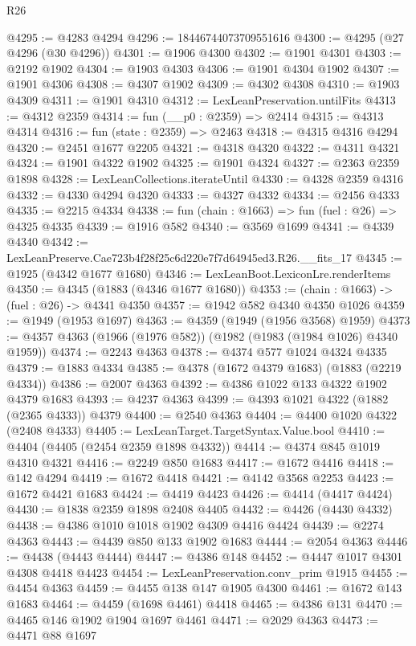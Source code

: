 \begin{lexlean}{R26}
\begin{coremodule}
@4295 := @4283 @4294
@4296 := 18446744073709551616
@4300 := @4295 (@27 @4296 (@30 @4296))
@4301 := @1906 @4300
@4302 := @1901 @4301
@4303 := @2192 @1902
@4304 := @1903 @4303
@4306 := @1901 @4304 @1902
@4307 := @1901 @4306
@4308 := @4307 @1902
@4309 := @4302 @4308
@4310 := @1903 @4309
@4311 := @1901 @4310
@4312 := LexLeanPreservation.untilFits
@4313 := @4312 @2359
@4314 := fun (__p0 : @2359) => @2414
@4315 := @4313 @4314
@4316 := fun (state : @2359) => @2463
@4318 := @4315 @4316 @4294
@4320 := @2451 @1677 @2205
@4321 := @4318 @4320
@4322 := @4311 @4321
@4324 := @1901 @4322 @1902
@4325 := @1901 @4324
@4327 := @2363 @2359 @1898
@4328 := LexLeanCollections.iterateUntil
@4330 := @4328 @2359 @4316
@4332 := @4330 @4294 @4320
@4333 := @4327 @4332
@4334 := @2456 @4333
@4335 := @2215 @4334
@4338 := fun (chain : @1663) => fun (fuel : @26) => @4325 @4335
@4339 := @1916 @582
@4340 := @3569 @1699
@4341 := @4339 @4340
@4342 := LexLeanPreserve.Cae723b4f28f25c6d220e7f7d64945ed3.R26.__fits_17
@4345 := @1925 (@4342 @1677 @1680)
@4346 := LexLeanBoot.LexiconLre.renderItems
@4350 := @4345 (@1883 (@4346 @1677 @1680))
@4353 := (chain : @1663) -> (fuel : @26) -> @4341 @4350
@4357 := @1942 @582 @4340 @4350 @1026
@4359 := @1949 (@1953 @1697)
@4363 := @4359 (@1949 (@1956 @3568) @1959)
@4373 := @4357 @4363 (@1966 (@1976 @582)) (@1982 (@1983 (@1984 @1026) @4340 @1959))
@4374 := @2243 @4363
@4378 := @4374 @577 @1024 @4324 @4335
@4379 := @1883 @4334
@4385 := @4378 (@1672 @4379 @1683) (@1883 (@2219 @4334))
@4386 := @2007 @4363
@4392 := @4386 @1022 @133 @4322 @1902 @4379 @1683
@4393 := @4237 @4363
@4399 := @4393 @1021 @4322 (@1882 (@2365 @4333)) @4379
@4400 := @2540 @4363
@4404 := @4400 @1020 @4322 (@2408 @4333)
@4405 := LexLeanTarget.TargetSyntax.Value.bool
@4410 := @4404 (@4405 (@2454 @2359 @1898 @4332))
@4414 := @4374 @845 @1019 @4310 @4321
@4416 := @2249 @850 @1683
@4417 := @1672 @4416
@4418 := @142 @4294
@4419 := @1672 @4418
@4421 := @4142 @3568 @2253
@4423 := @1672 @4421 @1683
@4424 := @4419 @4423
@4426 := @4414 (@4417 @4424)
@4430 := @1838 @2359 @1898 @2408 @4405
@4432 := @4426 (@4430 @4332)
@4438 := @4386 @1010 @1018 @1902 @4309 @4416 @4424
@4439 := @2274 @4363
@4443 := @4439 @850 @133 @1902 @1683
@4444 := @2054 @4363
@4446 := @4438 (@4443 @4444)
@4447 := @4386 @148
@4452 := @4447 @1017 @4301 @4308 @4418 @4423
@4454 := LexLeanPreservation.conv_prim @1915
@4455 := @4454 @4363
@4459 := @4455 @138 @147 @1905 @4300
@4461 := @1672 @143 @1683
@4464 := @4459 (@1698 @4461) @4418
@4465 := @4386 @131
@4470 := @4465 @146 @1902 @1904 @1697 @4461
@4471 := @2029 @4363
@4473 := @4471 @88 @1697

\end{coremodule}
\end{lexlean}
